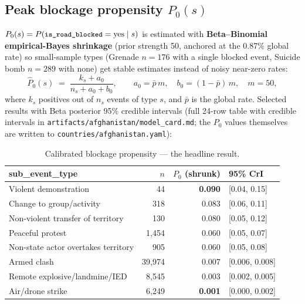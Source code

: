 \documentclass[11pt,a4paper]{article}
\newcommand{\code}[1]{\texttt{\small #1}}
\begin{document}
\subsection{Peak blockage propensity $P_0(s)$}

$P_0(s)=P(\code{is\_road\_blocked}=\text{yes}\mid s)$ is estimated with \textbf{Beta--Binomial
empirical-Bayes shrinkage} (prior strength 50, anchored at the 0.87\% global rate) so
small-sample types (Grenade $n{=}176$ with a single blocked event, Suicide bomb $n{=}289$ with
none) get stable estimates instead of noisy near-zero rates:
\begin{equation}
\hat{P}_0(s) \;=\; \frac{k_s + a_0}{n_s + a_0 + b_0},
\qquad a_0 = \bar p\,m,\quad b_0=(1-\bar p)\,m,\quad m=50,
\end{equation}
where $k_s$ positives out of $n_s$ events of type $s$, and $\bar p$ is the global rate.
Selected results with Beta posterior 95\% credible intervals (full 24-row table with credible
intervals in \code{artifacts/afghanistan/model\_card.md}; the $P_0$ values themselves are
written to \code{countries/afghanistan.yaml}):

\begin{table}[h]
\centering
\renewcommand{\arraystretch}{1.2}
\begin{tabular}{@{}l r r l@{}}
\toprule
\textbf{sub\_event\_type} & \textbf{$n$} & \textbf{$P_0$ (shrunk)} & \textbf{95\% CrI} \\
\midrule
Violent demonstration                 & 44       & \textbf{0.090} & [0.04, 0.15] \\
Change to group/activity              & 318      & 0.083 & [0.06, 0.11] \\
Non-violent transfer of territory     & 130      & 0.080 & [0.05, 0.12] \\
Peaceful protest                      & 1{,}454  & 0.060 & [0.05, 0.07] \\
Non-state actor overtakes territory   & 905      & 0.060 & [0.05, 0.08] \\
Armed clash                           & 39{,}974 & 0.007 & [0.006, 0.008] \\
Remote explosive/landmine/IED         & 8{,}545  & 0.003 & [0.002, 0.005] \\
Air/drone strike                      & 6{,}249  & \textbf{0.001} & [0.000, 0.002] \\
\bottomrule
\end{tabular}
\caption{Calibrated blockage propensity --- the headline result.}
\label{tab:p0}
\end{table}
\end{document}
